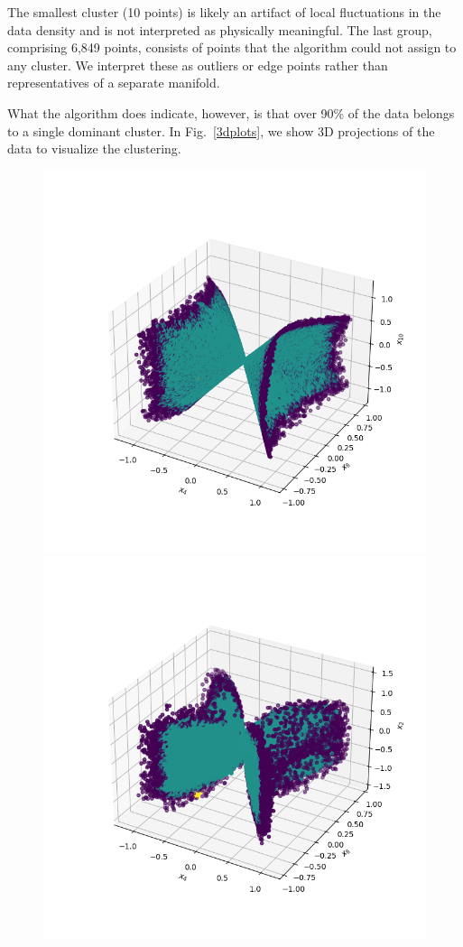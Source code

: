 \documentclass[11pt]{article}
\begin{document}
		The smallest cluster (10 points) is likely an artifact of local fluctuations in the data density and is not interpreted as physically meaningful. The last group, comprising 6,849 points, consists of points that the algorithm could not assign to any cluster. We interpret these as outliers or edge points rather than representatives of a separate manifold.
		
		What the algorithm does indicate, however, is that over 90\% of the data belongs to a single dominant cluster. In Fig.~\ref{3dplots}, we show 3D projections of the data to visualize the clustering.
		
		\begin{figure}
			\centering
			\includegraphics[scale=0.4]{Figures/3d_plot_x4_x8_x10.png}
			\includegraphics[scale=0.4]{Figures/3d_plot_x2_x4_x8.png}

\end{figure}
\end{document}
